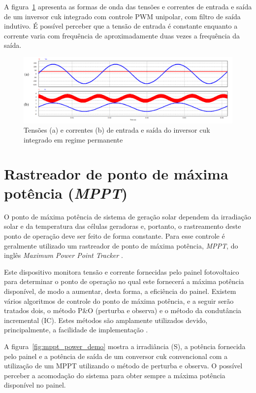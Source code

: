 \documentclass[
	12pt,				%
	openany,
	onseside,
	a4paper,			%
	english,			%
	french,				%
	spanish,			%
	brazil,				%
	]{abntex2}
\begin{document}
A figura~\ref{fig:integ_cuk_In_Out_zoom} apresenta as formas de onda das tensões e correntes de entrada e saída de um inversor cuk integrado com controle PWM unipolar, com filtro de saída indutivo. É possível perceber que a tensão de entrada é constante enquanto a corrente varia com frequência de aproximadamente duas vezes a frequência da saída.

\begin{figure}[htb]
	\centering
		\includegraphics[width= \linewidth]{cuk_integ_In_Out_zoom_2}
		\caption{Tensões (a) e correntes (b) de entrada e saída do inversor cuk integrado em regime permanente}
		\label{fig:integ_cuk_In_Out_zoom}
\end{figure}


\section{Rastreador de ponto de máxima potência (\textit{MPPT})}

O ponto de máxima potência de sistema de geração solar dependem da irradiação solar e da temperatura das células geradoras e, portanto, o rastreamento deste ponto de operação deve ser feito de forma constante. Para esse controle é geralmente utilizado um rastreador de ponto de máxima potência, \emph{MPPT}, do inglês \textit{Maximum Power Point Tracker} \cite{Talha_MPPT}. 

Este dispositivo monitora tensão e corrente fornecidas pelo painel fotovoltaico para determinar o ponto de operação no qual este fornecerá a máxima potência disponível, de modo a aumentar, desta forma, a eficiência do painel. Existem vários algoritmos de controle do ponto de máxima potência, e a seguir serão tratados dois, o método P\&O (perturba e observa) e o método da condutância incremental (IC). Estes métodos são amplamente utilizados devido, principalmente, a facilidade de implementação \cite{MPPT_P&O_IC}\cite{Talha_MPPT}.

A figura~\ref{fig:mppt_power_demo} mostra a irradiância (S), a potência fornecida pelo painel e a potência de saída de um conversor cuk convencional com a utilização de um MPPT utilizando o método de perturba e observa. O possível perceber a acomodação do sistema para obter sempre a máxima potência disponível no painel.   
\end{document}
